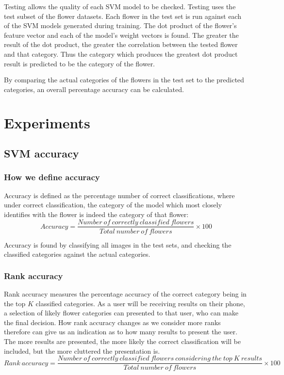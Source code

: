 \documentclass[11pt, a4paper]{report}
\begin{document}
Testing allows the quality of each SVM model to be checked. Testing uses the test subset of the flower datasets. Each flower in the test set is run against each of the SVM models generated during training. The dot product of the  flower's feature vector and each of the model's weight vectors is found. The greater the result of the dot product, the greater the correlation between the tested flower and that category. Thus the category which produces the greatest dot product result is predicted to be the category of the flower.

By comparing the actual categories of the flowers in the test set to the predicted categories, an overall percentage accuracy can be calculated.


\section{Experiments}

\subsection{SVM accuracy}

\subsubsection{How we define accuracy}

Accuracy is defined as the percentage number of correct classifications, where under correct classification, the category of the model which most closely identifies with the flower is indeed the category of that flower:
$$
Accuracy = \frac{Number\ of\ correctly\ classified\ flowers}{Total\ number\ of\ flowers}
\times 100
$$

Accuracy is found by classifying all images in the test sets, and checking the classified categories against the actual categories. 

\subsubsection{Rank accuracy}

Rank accuracy measures the percentage accuracy of the correct category being in the top $K$ classified categories. As a user will be receiving results on their phone, a selection of likely flower categories can presented to that user, who can make the final decision. How rank accuracy changes as we consider more ranks therefore can give us an indication as to how many results to present the user. The more results are presented, the more likely the correct classification will be included, but the more cluttered the presentation is.
$$
Rank\ accuracy = \frac{Number\ of\ correctly\ classified\ flowers\ considering\ the\ top\ K\ results}{Total\ number\ of\ flowers}
\times 100
$$
\end{document}
